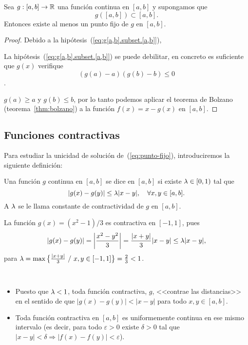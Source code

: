 \begin{proposition}
  \label{pro:existencia-punto-fijo}
  Sea $g:[a,b]\to\operatorname{{\mathbb R}}$ una función continua en $[a,b]$ y supongamos
  que
  \begin{equation}
    g([a,b])\subset [a,b].
    \label{eq:g[a,b].subset.[a,b]}
  \end{equation}
  Entonces existe al menos un punto fijo de $g$ en $[a,b]$.
\end{proposition}
\begin{proof}
  Debido a la hipótesis~(\ref{eq:g[a,b].subset.[a,b]}),
  \begin{extension}
    La hipótesis~(\ref{eq:g[a,b].subset.[a,b]}) se puede debilitar, en
    concreto es suficiente que $g(x)$ verifique
    $$(g(a)-a)(g(b)-b)\le 0$$.
  \end{extension}
  $g(a)\ge a$ y
  $g(b)\le b$, por lo tanto podemos aplicar el teorema de Bolzano
  (teorema~\ref{thm:bolzano}) a la función $f(x)=x-g(x)$ en $[a,b]$.
\end{proof}

\subsection*{Funciones contractivas}

Para estudiar la unicidad de solución de~(\ref{eq:punto-fijo}),
introduciremos la siguiente definición:

\begin{definition}
  Una función $g$ continua en $[a,b]$ se dice  en
  $[a,b]$ si existe $\lambda\in[0,1)$ tal que
  \begin{equation*}
    |g(x)-g(y)| \le \lambda |x-y|, \quad \forall x,y \in [a,b].
    \label{eq:contractividad}
  \end{equation*}
  A $\lambda$ se le llama constante de contractividad de $g$ en $[a,b]$.
  \label{def:funcion.contractiva}
\end{definition}

\begin{example}
  La función $g(x)=(x^2-1)/3$ es contractiva en $[-1,1]$, pues
  $$
  |g(x)-g(y)|=\left|\frac{x^2-y^2}{3}\right| = \frac{|x+y|}{3}|x-y| \le
  \lambda |x-y|,
  $$
  para $\lambda=\max \big\{ \frac{|x+y|}{3}\ /\ x,y\in [-1,1]
  \big\} =\frac23 <1$.
\end{example}

\begin{remark}~
  \begin{itemize}
  \item Puesto que $\lambda<1$, toda función contractiva, $g$, <<contrae las
    distancias>> en el sentido de que $|g(x)-g(y)|<|x-y|$ para todo
    $x,y\in [a,b]$.
  \item Toda función contractiva en $[a,b]$ es
    uniformemente continua en ese mismo intervalo (es decir, para
    todo $\varepsilon>0$ existe $\delta>0$ tal que $|x-y|<\delta
    \Rightarrow |f(x)-f(y)|<\varepsilon$).
  \end{itemize}
\end{remark}

